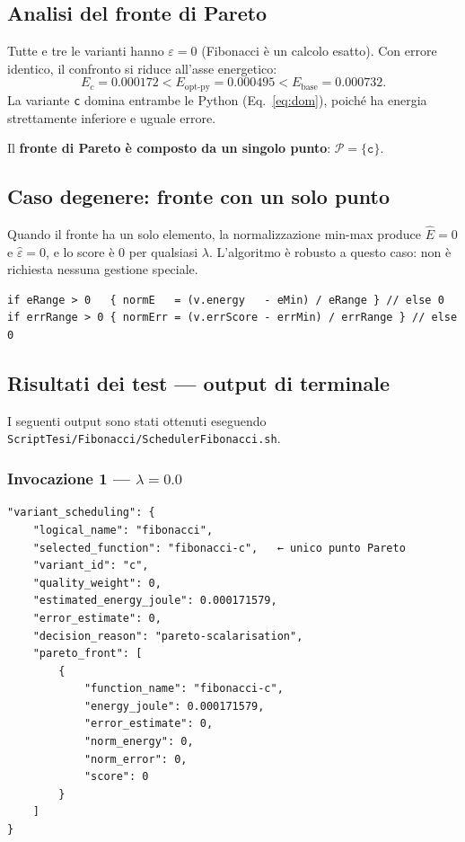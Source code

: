 \documentclass[a4paper,12pt]{article}
\begin{document}
\subsection{Analisi del fronte di Pareto}

Tutte e tre le varianti hanno $\varepsilon = 0$ (Fibonacci è un
calcolo esatto).  Con errore identico, il confronto si riduce
all'asse energetico:
\begin{equation}
  E_c = 0.000172 < E_{\text{opt-py}} = 0.000495 < E_{\text{base}} = 0.000732.
\end{equation}
La variante \texttt{c} domina entrambe le Python (Eq.~\ref{eq:dom}),
poiché ha energia strettamente inferiore e uguale errore.

Il \textbf{fronte di Pareto è composto da un singolo punto}:
$\mathcal{P} = \{\texttt{c}\}$.

\subsection{Caso degenere: fronte con un solo punto}

Quando il fronte ha un solo elemento, la normalizzazione min-max
produce $\hat{E}=0$ e $\hat{\varepsilon}=0$, e lo
score è 0 per qualsiasi $\lambda$. L'algoritmo è robusto a questo
caso: non è richiesta nessuna gestione speciale.

\begin{lstlisting}[style=go, caption={Gestione robusta quando range = 0}]
if eRange > 0   { normE   = (v.energy   - eMin) / eRange } // else 0
if errRange > 0 { normErr = (v.errScore - errMin) / errRange } // else 0
\end{lstlisting}

\subsection{Risultati dei test --- output di terminale}

I seguenti output sono stati ottenuti eseguendo
\texttt{ScriptTesi/Fibonacci/SchedulerFibonacci.sh}.

\subsubsection{Invocazione 1 --- $\lambda = 0.0$}

\begin{lstlisting}[style=json]
"variant_scheduling": {
    "logical_name": "fibonacci",
    "selected_function": "fibonacci-c",   ← unico punto Pareto
    "variant_id": "c",
    "quality_weight": 0,
    "estimated_energy_joule": 0.000171579,
    "error_estimate": 0,
    "decision_reason": "pareto-scalarisation",
    "pareto_front": [
        {
            "function_name": "fibonacci-c",
            "energy_joule": 0.000171579,
            "error_estimate": 0,
            "norm_energy": 0,
            "norm_error": 0,
            "score": 0
        }
    ]
}
\end{lstlisting}
\end{document}
